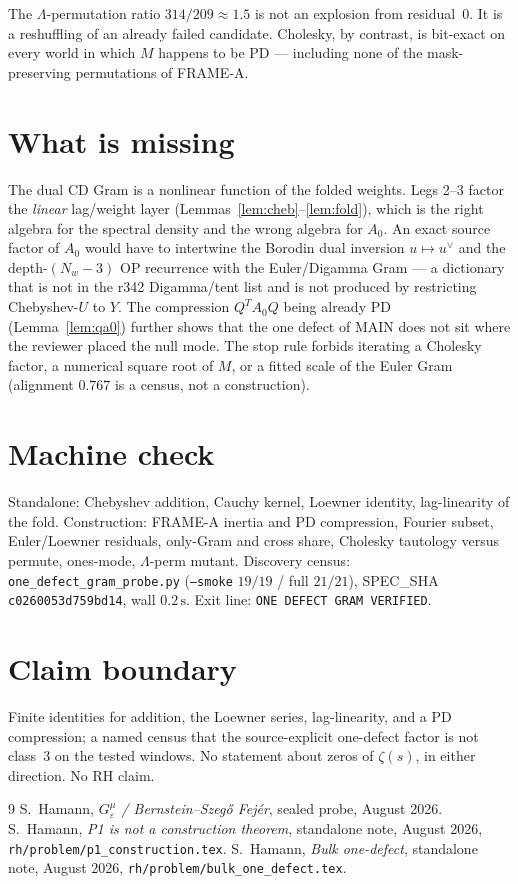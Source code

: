 \documentclass[11pt]{article}
\theoremstyle{remark}
\begin{document}
The $\Lambda$-permutation ratio $314/209\approx 1.5$ is not an
explosion from residual~$0$.
It is a reshuffling of an already failed candidate.
Cholesky, by contrast, is bit-exact on every world in which
$M$ happens to be PD --- including none of the
mask-preserving permutations of FRAME-A.

\section{What is missing}\label{sec:miss}

The dual CD Gram is a nonlinear function of the folded
weights.
Legs 2--3 factor the \emph{linear} lag/weight layer
(Lemmas~\ref{lem:cheb}--\ref{lem:fold}), which is the right
algebra for the spectral density and the wrong algebra for
$A_0$.
An exact source factor of $A_0$ would have to intertwine
the Borodin dual inversion $u\mapsto u^\vee$ and the
depth-$(N_w-3)$ OP recurrence with the Euler/Digamma Gram
--- a dictionary that is not in the r342 Digamma/tent list
and is not produced by restricting Chebyshev-$U$ to $Y$.
The compression $Q^T A_0 Q$ being already PD
(Lemma~\ref{lem:qa0}) further shows that the one defect of
MAIN does not sit where the reviewer placed the null mode.
The stop rule forbids iterating a Cholesky factor, a
numerical square root of $M$, or a fitted scale of the Euler
Gram (alignment $0.767$ is a census, not a construction).

\section*{Machine check}

Standalone: Chebyshev addition, Cauchy kernel, Loewner
identity, lag-linearity of the fold.
Construction: FRAME-A inertia and PD compression, Fourier
subset, Euler/Loewner residuals, only-Gram and cross share,
Cholesky tautology versus permute, ones-mode, $\Lambda$-perm
mutant.
Discovery census: \texttt{one\_defect\_gram\_probe.py}
(\texttt{--smoke} $19/19$ / full $21/21$), SPEC\_SHA
\texttt{c0260053d759bd14}, wall $0.2\,\mathrm{s}$.
Exit line: \texttt{ONE DEFECT GRAM VERIFIED}.

\section*{Claim boundary}

Finite identities for addition, the Loewner series, lag-linearity,
and a PD compression; a named census that the source-explicit
one-defect factor is not class~3 on the tested windows.
No statement about zeros of $\zeta(s)$, in either direction.
No RH claim.

\begin{thebibliography}{9}
S.~Hamann,
\textit{$G_\varepsilon^\mu$ / Bernstein--Szeg\H{o} Fej\'er},
sealed probe, August 2026.
S.~Hamann,
\textit{P1 is not a construction theorem},
standalone note, August 2026,
\texttt{rh/problem/p1\_construction.tex}.
S.~Hamann,
\textit{Bulk one-defect},
standalone note, August 2026,
\texttt{rh/problem/bulk\_one\_defect.tex}.
\end{thebibliography}
\end{document}

